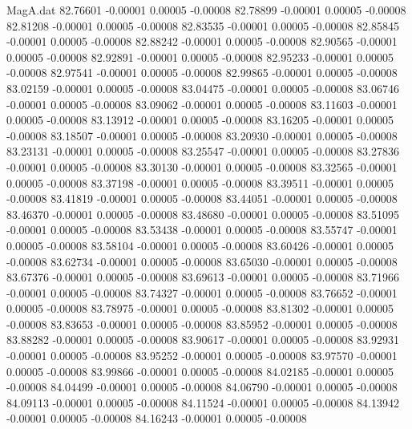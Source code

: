 \begin{filecontents}{MagA.dat}
  82.76601   -0.00001    0.00005   -0.00008
  82.78899   -0.00001    0.00005   -0.00008
  82.81208   -0.00001    0.00005   -0.00008
  82.83535   -0.00001    0.00005   -0.00008
  82.85845   -0.00001    0.00005   -0.00008
  82.88242   -0.00001    0.00005   -0.00008
  82.90565   -0.00001    0.00005   -0.00008
  82.92891   -0.00001    0.00005   -0.00008
  82.95233   -0.00001    0.00005   -0.00008
  82.97541   -0.00001    0.00005   -0.00008
  82.99865   -0.00001    0.00005   -0.00008
  83.02159   -0.00001    0.00005   -0.00008
  83.04475   -0.00001    0.00005   -0.00008
  83.06746   -0.00001    0.00005   -0.00008
  83.09062   -0.00001    0.00005   -0.00008
  83.11603   -0.00001    0.00005   -0.00008
  83.13912   -0.00001    0.00005   -0.00008
  83.16205   -0.00001    0.00005   -0.00008
  83.18507   -0.00001    0.00005   -0.00008
  83.20930   -0.00001    0.00005   -0.00008
  83.23131   -0.00001    0.00005   -0.00008
  83.25547   -0.00001    0.00005   -0.00008
  83.27836   -0.00001    0.00005   -0.00008
  83.30130   -0.00001    0.00005   -0.00008
  83.32565   -0.00001    0.00005   -0.00008
  83.37198   -0.00001    0.00005   -0.00008
  83.39511   -0.00001    0.00005   -0.00008
  83.41819   -0.00001    0.00005   -0.00008
  83.44051   -0.00001    0.00005   -0.00008
  83.46370   -0.00001    0.00005   -0.00008
  83.48680   -0.00001    0.00005   -0.00008
  83.51095   -0.00001    0.00005   -0.00008
  83.53438   -0.00001    0.00005   -0.00008
  83.55747   -0.00001    0.00005   -0.00008
  83.58104   -0.00001    0.00005   -0.00008
  83.60426   -0.00001    0.00005   -0.00008
  83.62734   -0.00001    0.00005   -0.00008
  83.65030   -0.00001    0.00005   -0.00008
  83.67376   -0.00001    0.00005   -0.00008
  83.69613   -0.00001    0.00005   -0.00008
  83.71966   -0.00001    0.00005   -0.00008
  83.74327   -0.00001    0.00005   -0.00008
  83.76652   -0.00001    0.00005   -0.00008
  83.78975   -0.00001    0.00005   -0.00008
  83.81302   -0.00001    0.00005   -0.00008
  83.83653   -0.00001    0.00005   -0.00008
  83.85952   -0.00001    0.00005   -0.00008
  83.88282   -0.00001    0.00005   -0.00008
  83.90617   -0.00001    0.00005   -0.00008
  83.92931   -0.00001    0.00005   -0.00008
  83.95252   -0.00001    0.00005   -0.00008
  83.97570   -0.00001    0.00005   -0.00008
  83.99866   -0.00001    0.00005   -0.00008
  84.02185   -0.00001    0.00005   -0.00008
  84.04499   -0.00001    0.00005   -0.00008
  84.06790   -0.00001    0.00005   -0.00008
  84.09113   -0.00001    0.00005   -0.00008
  84.11524   -0.00001    0.00005   -0.00008
  84.13942   -0.00001    0.00005   -0.00008
  84.16243   -0.00001    0.00005   -0.00008

\end{filecontents}
